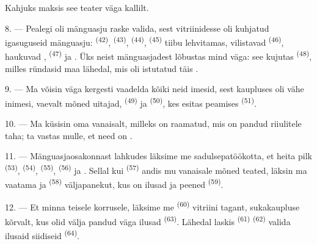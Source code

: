 Kahjuks maksis see teater väga kallilt.

8. --- Pealegi oli mänguasju raske valida, sest vitriinidesse oli kuhjatud igasuguseid
mänguasju:  \textsuperscript{(42)}, 
\textsuperscript{(43)},  \textsuperscript{(44)}, 
\textsuperscript{(45)} tiibu lehvitamas, vilistavad 
\textsuperscript{(46)}, haukuvad , 
\textsuperscript{(47)} ja . Üks neist mänguasjadest lõbustas mind
väga: see kujutas  \textsuperscript{(48)}, milles 
ründasid  maa lähedal, mis oli istutatud täis .


9. --- Ma võisin väga kergesti vaadelda kõiki neid imesid, sest kaupluses oli vähe
inimesi, vaevalt mõned uitajad,  \textsuperscript{(49)} ja
 \textsuperscript{(50)}, kes esitas  peamises
 \textsuperscript{(51)}.

10. --- Ma küsisin oma vanaisalt, milleks on raamatud, mis on pandud riiulitele
 taha; ta vastas mulle, et need on
.

\VUsaut{3.6mm}
\VUsaut{2.8mm}

11. --- Mänguasjaosakonnast lahkudes läksime me sadulsepatöökotta, et heita pilk
 \textsuperscript{(53)},  \textsuperscript{(54)},
 \textsuperscript{(55)},  \textsuperscript{(56)} ja
. Sellal kui  \textsuperscript{(57)} andis mu
vanaisale mõned teated, läksin ma vaatama  ja 
\textsuperscript{(58)} väljapanekut, kus on ilusad  ja peened
 \textsuperscript{(59)}.

12. --- Et minna teisele korrusele, läksime me 
\textsuperscript{(60)} vitriini tagant, sukakaupluse kõrvalt, kus olid välja pandud väga
ilusad  \textsuperscript{(63)}. Lähedal laskis 
\textsuperscript{(61)}  \textsuperscript{(62)} valida ilusaid siidiseid
 \textsuperscript{(64)}.


